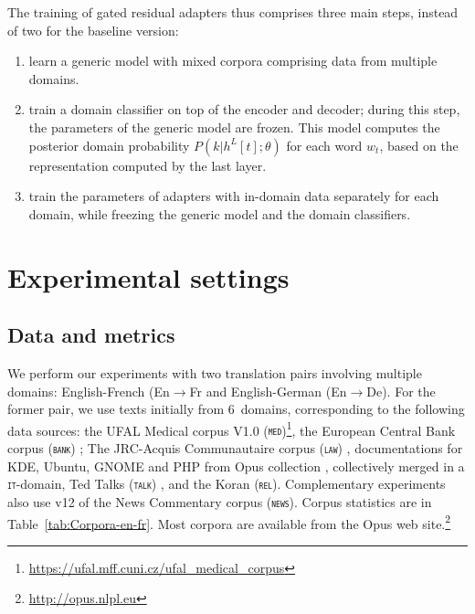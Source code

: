 \documentclass[11pt,a4paper]{article}
\newcommand{\fyFuture}[1]{\done[FY]\Todo[FY:]{\textcolor{red}{#1}}}
\newcommand{\domain}[1]{\texttt{\textsc{#1}}}
\begin{document}
The training of gated residual adapters thus comprises three main steps, instead of two for the baseline version:
\begin{enumerate}
\item learn a generic model with mixed corpora comprising data from multiple domains.
\item train a domain classifier on top of the encoder and decoder; during this step, the parameters of the generic model are frozen. This model computes the posterior domain probability $P(k|h^L[t]; \theta)$ for each word $w_t$, based on the representation computed by the last layer.
\item train the parameters of adapters with in-domain data separately for each domain, while freezing the generic model and the domain classifiers.
\end{enumerate}
\fyFuture{is this classifier important, can we train with the rest of the system ?}

\section{Experimental settings \label{sec:exp}}

\subsection{Data and metrics \label{ssec:corpora}}
We perform our experiments with two translation pairs involving multiple domains: English-French (En$\rightarrow$Fr and English-German (En$\rightarrow$De). For the former pair, we use texts initially from 6~domains, corresponding to the following data sources: the UFAL Medical corpus V1.0 (\domain{med})\footnote{\url{https://ufal.mff.cuni.cz/ufal_medical_corpus}}, the European Central Bank corpus (\domain{bank}) \cite{Tiedemann12parallel}; The JRC-Acquis Communautaire corpus (\domain{law}) \cite{Steinberger06acquis}, documentations for KDE, Ubuntu, GNOME and PHP from Opus collection \cite{Tiedemann09news}, collectively merged in a \domain{it}-domain, Ted Talks (\domain{talk}) \cite{Cettolo12wit}, and the Koran (\domain{rel}). Complementary experiments also use v12 of the News Commentary corpus (\domain{news}). Corpus statistics are in Table~\ref{tab:Corpora-en-fr}.  Most corpora are available from the Opus web site.\footnote{\url{http://opus.nlpl.eu}}
\end{document}
